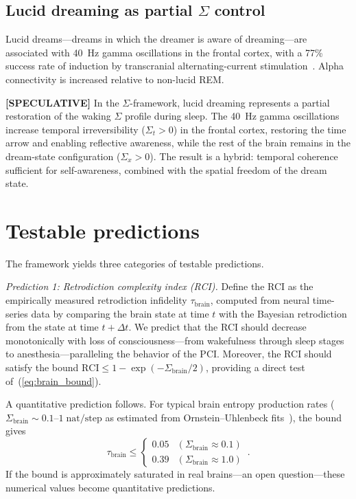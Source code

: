 \documentclass[prl,twocolumn,superscriptaddress,longbibliography,floatfix]{revtex4-2}
\newcommand{\tauasym}{\tau}
\newcommand{\Sbrain}{\Sigma_{\mathrm{brain}}}
\begin{document}
\subsection{Lucid dreaming as partial $\Sigma$ control}
\label{subsec:lucid}

Lucid dreams---dreams in which the dreamer is aware of
dreaming---are associated with 40~Hz gamma oscillations in the
frontal cortex, with a 77\% success rate of induction by
transcranial alternating-current
stimulation~\cite{Voss2014}.  Alpha connectivity is increased
relative to non-lucid REM.

\textbf{[SPECULATIVE]}
In the $\Sigma$-framework, lucid dreaming represents a partial
restoration of the waking $\Sigma$ profile during sleep.  The 40~Hz
gamma oscillations increase temporal irreversibility
($\Sigma_t > 0$) in the frontal cortex, restoring the time arrow
and enabling reflective awareness, while the rest of the brain
remains in the dream-state configuration ($\Sigma_x > 0$).  The
result is a hybrid: temporal coherence sufficient for self-awareness,
combined with the spatial freedom of the dream state.


\section{Testable predictions}
\label{sec:predictions}

The framework yields three categories of testable predictions.

\emph{Prediction 1: Retrodiction complexity index (RCI).}
Define the RCI as the empirically measured retrodiction infidelity
$\tauasym_{\mathrm{brain}}$, computed from neural time-series data
by comparing the brain state at time $t$ with the Bayesian
retrodiction from the state at time $t+\Delta t$.  We predict that
the RCI should decrease monotonically with loss of
consciousness---from wakefulness through sleep stages to
anesthesia---paralleling the behavior of the PCI.  Moreover, the
RCI should satisfy the bound
$\text{RCI} \leq 1 - \exp(-\Sbrain/2)$, providing a direct
test of~(\ref{eq:brain_bound}).

A quantitative prediction follows.  For typical brain entropy
production rates ($\Sbrain \sim 0.1$--$1\;\mathrm{nat/step}$ as
estimated from Ornstein--Uhlenbeck fits~\cite{Lynn2023}), the
bound gives
\begin{equation}
\tauasym_{\mathrm{brain}} \leq
\begin{cases}
0.05 & (\Sbrain \approx 0.1) \\
0.39 & (\Sbrain \approx 1.0)
\end{cases}\,.
\end{equation}
If the bound is approximately saturated in real brains---an open
question---these numerical values become quantitative predictions.
\end{document}
